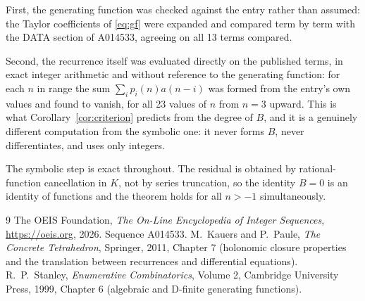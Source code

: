 \documentclass[11pt,a4paper]{article}
\theoremstyle{plain}
\theoremstyle{definition}
\begin{document}
First, the generating function was checked against the entry rather than assumed: the
Taylor coefficients of \eqref{eq:gf} were expanded and compared term by term with the DATA
section of A014533, agreeing on all 13 terms compared.

Second, the recurrence itself was evaluated directly on the published terms, in exact
integer arithmetic and without reference to the generating function: for each $n$ in range
the sum $\sum_{i}p_{i}(n)a(n-i)$ was formed from the entry's own values and found to
vanish, for all 23 values of $n$ from $n=3$ upward. This is what
Corollary~\ref{cor:criterion} predicts from the degree of $B$, and it is a genuinely
different computation from the symbolic one: it never forms $B$, never differentiates, and
uses only integers.

The symbolic step is exact throughout. The residual is obtained by rational-function
cancellation in $K$, not by series truncation, so the identity $B=0$ is an
identity of functions and the theorem holds for all $n>-1$ simultaneously.

\begin{thebibliography}{9}
 The OEIS Foundation, \emph{The On-Line Encyclopedia of Integer Sequences},
\url{https://oeis.org}, 2026. Sequence A014533.
 M.~Kauers and P.~Paule, \emph{The Concrete Tetrahedron}, Springer, 2011,
Chapter 7 (holonomic closure properties and the translation between recurrences and
differential equations).
 R.~P.~Stanley, \emph{Enumerative Combinatorics}, Volume 2, Cambridge
University Press, 1999, Chapter 6 (algebraic and D-finite generating functions).
\end{thebibliography}
\end{document}
